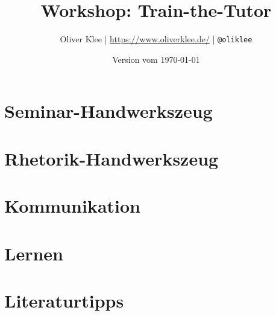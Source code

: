 \documentclass[a4paper,openany,twoside,titlepage,10pt,headsepline]{scrbook}
\author{Oliver Klee | \url{https://www.oliverklee.de/} | \texttt{@oliklee}}
\title{Workshop: Train-the-Tutor}
\date{Version vom \today}
\begin{document}
\frontmatter

\maketitle

\tableofcontents

\mainmatter

\chapter{Seminar-Handwerkszeug}










\chapter{Rhetorik-Handwerkszeug}




\chapter{Kommunikation}






\chapter{Lernen}















\backmatter

\chapter{Literaturtipps}
\end{document}
